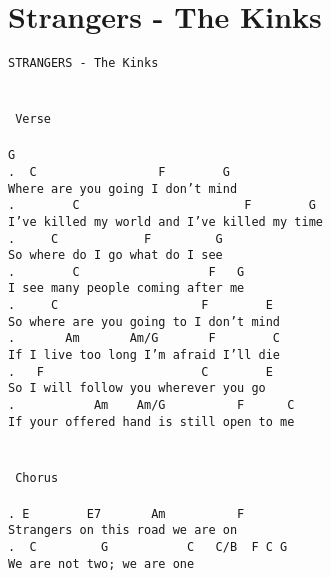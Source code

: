 \newpage
\section{Strangers - The Kinks}
\label{Strangers - The Kinks}
\texttt{STRANGERS\ -\ The\ Kinks\\
\\
\\
\lbrack\ Verse\rbrack\\
\\
G\\
. \ C\ \ \ \ \ \ \ \ \ \ \ \ \ \ \ \ \ F\ \ \ \ \ \ \ \ G\\
Where\ are\ you\ going\ I\ don't\ mind\\
. \ \ \ \ \ \ \ C\ \ \ \ \ \ \ \ \ \ \ \ \ \ \ \ \ \ \ \ \ \ \ F\ \ \ \ \ \ \ \ G\\
I've\ killed\ my\ world\ and\ I've\ killed\ my\ time\\
. \ \ \ \ C\ \ \ \ \ \ \ \ \ \ \ \ F\ \ \ \ \ \ \ \ \ G\\
So\ where\ do\ I\ go\ what\ do\ I\ see\\
. \ \ \ \ \ \ \ C\ \ \ \ \ \ \ \ \ \ \ \ \ \ \ \ \ \ F\ \ \ G\\
I\ see\ many\ people\ coming\ after\ me\\
. \ \ \ \ C\ \ \ \ \ \ \ \ \ \ \ \ \ \ \ \ \ \ \ \ F\ \ \ \ \ \ \ \ E\\
So\ where\ are\ you\ going\ to\ I\ don't\ mind\\
. \ \ \ \ \ \ Am\ \ \ \ \ \ \ Am/G\ \ \ \ \ \ \ F\ \ \ \ \ \ \ \ C\\
If\ I\ live\ too\ long\ I'm\ afraid\ I'll\ die\\
. \ \ F\ \ \ \ \ \ \ \ \ \ \ \ \ \ \ \ \ \ \ \ \ \ C\ \ \ \ \ \ \ \ E\\
So\ I\ will\ follow\ you\ wherever\ you\ go\\
. \ \ \ \ \ \ \ \ \ \ Am\ \ \ \ Am/G\ \ \ \ \ \ \ \ \ \ F\ \ \ \ \ \ C\\
If\ your\ offered\ hand\ is\ still\ open\ to\ me\\
\\
\\
\lbrack\ Chorus\rbrack\\
\\
. E\ \ \ \ \ \ \ \ E7\ \ \ \ \ \ \ Am\ \ \ \ \ \ \ \ \ \ F\\
Strangers\ on\ this\ road\ we\ are\ on\\
. \ C\ \ \ \ \ \ \ \ \ G\ \ \ \ \ \ \ \ \ \ \ C\ \ \ C/B\ \ F\ C\ G\\
We\ are\ not\ two;\ we\ are\ one\\
}
